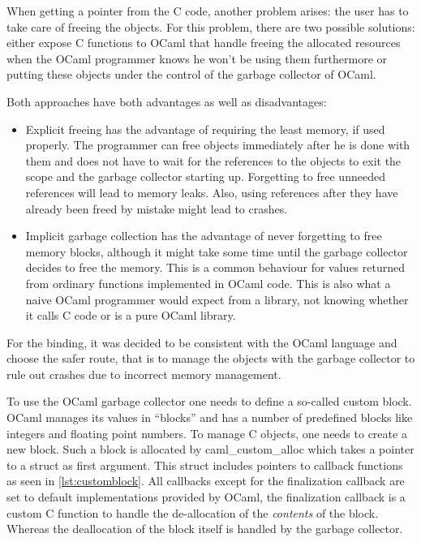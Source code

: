 \documentclass[parskip=half]{scrreprt}
\newcommand\inline[1]{{\addfontfeature{Letters=SmallCaps}#1}}
\begin{document}
When getting a pointer from the C code, another problem arises: the user has to
take care of freeing the objects. For this problem, there are two possible
solutions: either expose C functions to OCaml that handle freeing the allocated
resources when the OCaml programmer knows he won't be using them furthermore or
putting these objects under the control of the garbage collector of OCaml.

Both approaches have both advantages as well as disadvantages:

\begin{itemize}
  \item Explicit freeing has the advantage of requiring the least memory, if
    used properly. The programmer can free objects immediately after he is done
    with them and does not have to wait for the references to the objects to
    exit the scope and the garbage collector starting up. Forgetting to free
    unneeded references will lead to memory leaks. Also, using references after
    they have already been freed by mistake might lead to crashes.
  \item Implicit garbage collection has the advantage of never forgetting to
    free memory blocks, although it might take some time until the garbage
    collector decides to free the memory. This is a common behaviour for
    values returned from ordinary functions implemented in OCaml code. This is
    also what a naive OCaml programmer would expect from a library, not
    knowing whether it calls C code or is a pure OCaml library.
\end{itemize}

For the binding, it was decided to be consistent with the OCaml language and
choose the safer route, that is to manage the objects with the garbage
collector to rule out crashes due to incorrect memory management.

To use the OCaml garbage collector one needs to define a so-called custom
block. OCaml manages its values in \enquote{blocks} and has a number of
predefined blocks like integers and floating point numbers. To manage C
objects, one needs to create a new block. Such a block is allocated by
\inline{caml\_custom\_alloc} which takes a pointer to a struct as first
argument. This struct includes pointers to callback functions as seen in
\autoref{lst:customblock}. All callbacks except for the finalization callback
are set to default implementations provided by OCaml, the finalization callback
is a custom C function to handle the de-allocation of the \emph{contents} of
the block. Whereas the deallocation of the block itself is handled by the
garbage collector.
\end{document}
